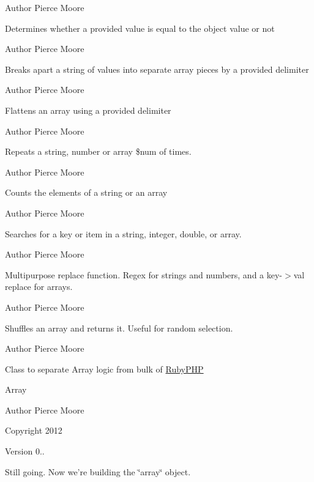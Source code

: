 \begin{DoxyAuthor}{Author}
Pierce Moore
\end{DoxyAuthor}
Determines whether a provided value is equal to the object value or not

\begin{DoxyAuthor}{Author}
Pierce Moore
\end{DoxyAuthor}
Breaks apart a string of values into separate array pieces by a provided delimiter

\begin{DoxyAuthor}{Author}
Pierce Moore
\end{DoxyAuthor}
Flattens an array using a provided delimiter

\begin{DoxyAuthor}{Author}
Pierce Moore
\end{DoxyAuthor}
Repeats a string, number or array \$num of times.

\begin{DoxyAuthor}{Author}
Pierce Moore
\end{DoxyAuthor}
Counts the elements of a string or an array

\begin{DoxyAuthor}{Author}
Pierce Moore
\end{DoxyAuthor}
Searches for a key or item in a string, integer, double, or array.

\begin{DoxyAuthor}{Author}
Pierce Moore
\end{DoxyAuthor}
Multipurpose replace function. Regex for strings and numbers, and a key-\/$>$val replace for arrays.

\begin{DoxyAuthor}{Author}
Pierce Moore
\end{DoxyAuthor}
Shuffles an array and returns it. Useful for random selection.

\begin{DoxyAuthor}{Author}
Pierce Moore
\end{DoxyAuthor}
Class to separate Array logic from bulk of \hyperlink{namespace_ruby_p_h_p}{Ruby\-P\-H\-P}

Array \begin{DoxyAuthor}{Author}
Pierce Moore 
\end{DoxyAuthor}
\begin{DoxyCopyright}{Copyright}
2012 
\end{DoxyCopyright}
\begin{DoxyVersion}{Version}
0..
\end{DoxyVersion}
Still going. Now we're building the \char`\"{}array\char`\"{} object.

